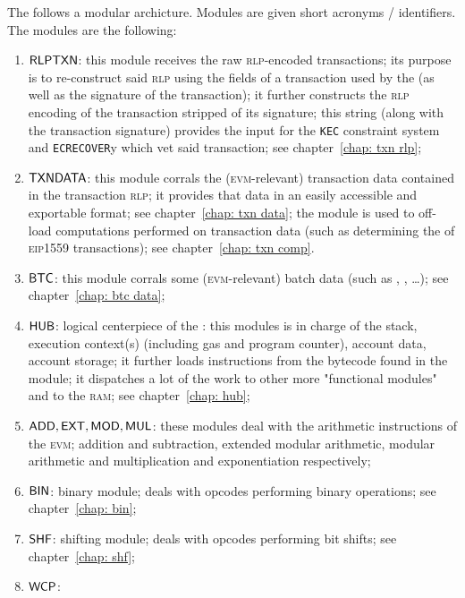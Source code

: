 The \zkEvm{} follows a modular archicture. Modules are given short acronyms / identifiers. The modules are the following:
\begin{enumerate}
	\item $\textsf{RLPTXN}$:
		this module receives the raw \textsc{rlp}-encoded transactions;
		its purpose is to re-construct said \textsc{rlp} using the fields of a transaction used by the \zkEvm{} (as well as the signature of the transaction);
		it further constructs the \textsc{rlp} encoding of the transaction stripped of its signature;
		this string (along with the transaction signature) provides the input for the \texttt{KEC} constraint system and \texttt{ECRECOVER}y which vet said transaction;
		see chapter~\ref{chap: txn rlp};
	\item $\textsf{TXNDATA}{}$:
		this module corrals the (\textsc{evm}-relevant) transaction data contained in the transaction \textsc{rlp};
		it provides that data in an easily accessible and exportable format;
		see chapter~\ref{chap: txn data};
		\saNote{} the \btcMod{} module is used to off-load computations performed on transaction data (such as determining the  of \textsc{eip1559} transactions); see chapter~\ref{chap: txn comp}.
	\item $\textsf{BTC}{}$:
		this module corrals some (\textsc{evm}-relevant) batch data (such as , , \dots);
		see chapter~\ref{chap: btc data};
	\item $\textsf{HUB}{}$:
		logical centerpiece of the \zkEvm{}: this modules is in charge of the stack, execution context(s) (including gas and program counter), account data, account storage;
		it further loads instructions from the bytecode found in the \romMod{} module;
		it dispatches a lot of the work to other more "functional modules" and to the \textsc{ram};
		see chapter~\ref{chap: hub};
	\item $\textsf{ADD}{}, \textsf{EXT}{}, \textsf{MOD}{}, \textsf{MUL}{}$:
		these modules deal with the arithmetic instructions of the \textsc{evm};
		addition and subtraction, extended modular arithmetic, modular arithmetic and multiplication and exponentiation respectively;
	\item $\textsf{BIN}{}$:
		binary module;
		deals with opcodes performing binary operations;
		see chapter~\ref{chap: bin};
	\item $\textsf{SHF}{}$:
		shifting module;
		deals with opcodes performing bit shifts;
		see chapter~\ref{chap: shf};
	\item $\textsf{WCP}{}$:

\end{enumerate}
